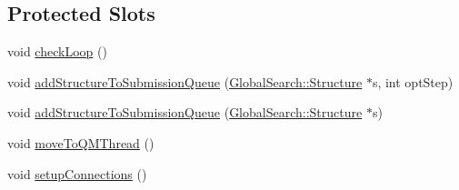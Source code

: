 \subsection*{Protected Slots}
\begin{DoxyCompactItemize}
\item 
void \hyperlink{classGlobalSearch_1_1QueueManager_a14256e9fd1827889506d8a767c19d55a}{check\+Loop} ()
\item 
void \hyperlink{classGlobalSearch_1_1QueueManager_a01a7a54687dfcf9929e274a0e451e52a}{add\+Structure\+To\+Submission\+Queue} (\hyperlink{classGlobalSearch_1_1Structure}{Global\+Search\+::\+Structure} $\ast$s, int opt\+Step)
\item 
void \hyperlink{classGlobalSearch_1_1QueueManager_a1eb84caa0ddac997149487cffb30074a}{add\+Structure\+To\+Submission\+Queue} (\hyperlink{classGlobalSearch_1_1Structure}{Global\+Search\+::\+Structure} $\ast$s)
\item 
void \hyperlink{classGlobalSearch_1_1QueueManager_a34f54a19ab868ce38fea4d27c27d60d8}{move\+To\+Q\+M\+Thread} ()
\item 
void \hyperlink{classGlobalSearch_1_1QueueManager_a3c2e07f49b09be24271551d85b7f312f}{setup\+Connections} ()
\end{DoxyCompactItemize}
